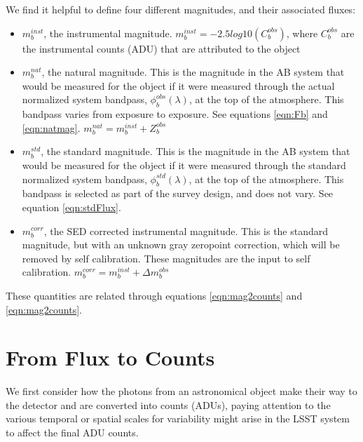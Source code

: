 \documentclass[12pt,preprint]{aastex}
\begin{document}
\begin{boxedminipage}{6.5in}
We find it helpful to define four different magnitudes, and their associated fluxes:
\begin{itemize}
\item{$m_b^{inst}$, the instrumental magnitude.  $m_b^{inst} = -2.5 log10(C_b^{obs})$, where $C_b^{obs}$ are the instrumental counts (ADU) that are attributed to the object}
\item{$m_b^{nat}$, the natural magnitude.  This is the magnitude in the AB system that would be measured for the object if it were measured through the actual normalized system bandpass, $\phi_b^{obs}(\lambda)$, at the top of the atmosphere.  This bandpass varies
from exposure to exposure.  See equations \ref{eqn:Fb} and \ref{eqn:natmag}. $m_b^{nat} = m_b^{inst} + Z_b^{obs}$}
\item{$m_b^{std}$}, the standard magnitude.  This is the magnitude in the AB system that would be measured for the object if it were measured through the standard normalized system bandpass, $\phi_b^{std}(\lambda)$, at the top of the atmosphere.  This bandpass is 
selected as part of the survey design, and does not vary.  See equation \ref{eqn:stdFlux}. 
\item{$m_b^{corr}$, the SED corrected instrumental magnitude.  This is the standard magnitude, but with an unknown gray zeropoint correction, which will be removed by self calibration.  These magnitudes are the input to self calibration. $m_b^{corr} = m_b^{inst} + \Delta m_b^{obs}$}
\end{itemize}
These quantities are related through equations \ref{eqn:mag2counts} and \ref{eqn:mag2counts}.
\end{boxedminipage}

\section{From Flux to Counts}
\label{sec:photons2counts}

We first consider how the photons from an astronomical object make their
way to the detector and are converted into counts (ADUs), paying attention to the various
temporal or spatial scales for variability might arise in the LSST
system to affect the final ADU counts. 
\end{document}
